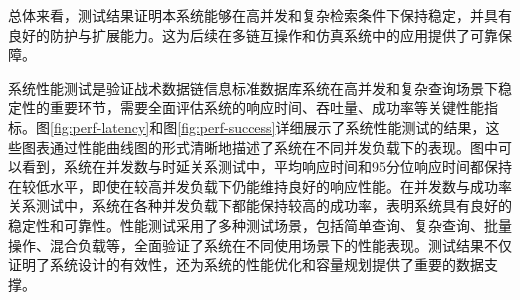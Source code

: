 总体来看，测试结果证明本系统能够在高并发和复杂检索条件下保持稳定，并具有良好的防护与扩展能力。这为后续在多链互操作和仿真系统中的应用提供了可靠保障。

系统性能测试是验证战术数据链信息标准数据库系统在高并发和复杂查询场景下稳定性的重要环节，需要全面评估系统的响应时间、吞吐量、成功率等关键性能指标。图\ref{fig:perf-latency}和图\ref{fig:perf-success}详细展示了系统性能测试的结果，这些图表通过性能曲线图的形式清晰地描述了系统在不同并发负载下的表现。图中可以看到，系统在并发数与时延关系测试中，平均响应时间和95分位响应时间都保持在较低水平，即使在较高并发负载下仍能维持良好的响应性能。在并发数与成功率关系测试中，系统在各种并发负载下都能保持较高的成功率，表明系统具有良好的稳定性和可靠性。性能测试采用了多种测试场景，包括简单查询、复杂查询、批量操作、混合负载等，全面验证了系统在不同使用场景下的性能表现。测试结果不仅证明了系统设计的有效性，还为系统的性能优化和容量规划提供了重要的数据支撑。

